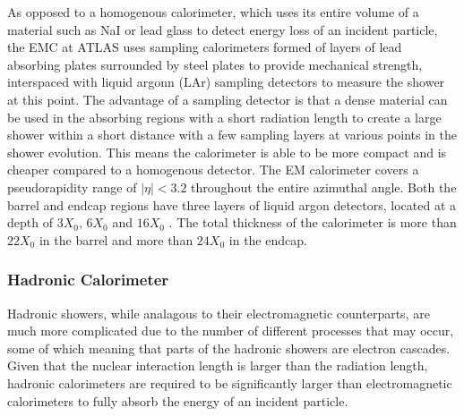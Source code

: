 \documentclass{article}
\begin{document}
As opposed to a homogenous calorimeter, which uses its entire volume of a material such as NaI or lead glass to detect energy loss of an incident particle, the EMC at ATLAS uses sampling calorimeters formed of layers of lead absorbing plates surrounded by steel plates to provide mechanical strength, interspaced with liquid argonn (LAr) sampling detectors to measure the shower at this point. The advantage of a sampling detector is that a dense material can be used in the absorbing regions with a short radiation length to create a large shower within a short distance with a few sampling layers at various points in the shower evolution. This means the calorimeter is able to be more compact and is cheaper compared to a homogenous detector. 
The EM calorimeter covers a pseudorapidity range of $|\eta|<3.2$ throughout the entire azimuthal angle. Both the barrel and endcap regions have three layers of liquid argon detectors, located at a depth of $3X_0$, $6X_0$ and $16X_0$ \cite{ATLASCalorimetry}. The total thickness of the calorimeter is more than $22X_0$ in the barrel and more than $24X_0$ in the endcap.

\subsubsection{Hadronic Calorimeter}
\label{sec:ATLAS_DetectorSchematics_HCAL}

Hadronic showers, while analagous to their electromagnetic counterparts, are much more complicated due to the number of different processes that may occur, some of which meaning that parts of the hadronic showers are electron cascades. Given that the nuclear interaction length is larger than the radiation length, hadronic calorimeters are required to be significantly larger than electromagnetic calorimeters to fully absorb the energy of an incident particle.
\end{document}
